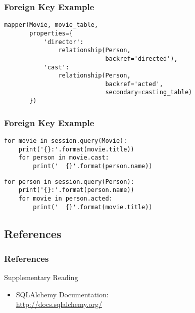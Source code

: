 \documentclass[dvipsnames]{beamer}
\theoremstyle{plain}
\begin{document}
\begin{frame}[fragile]
  \frametitle{Foreign Key Example}

  \begin{lstlisting}
mapper(Movie, movie_table,
       properties={
           'director':
               relationship(Person,
                            backref='directed'),
           'cast':
               relationship(Person,
                            backref='acted',
                            secondary=casting_table)
       })
  \end{lstlisting}
\end{frame}

\begin{frame}[fragile]
  \frametitle{Foreign Key Example}

  \begin{lstlisting}
for movie in session.query(Movie):
    print('{}:'.format(movie.title))
    for person in movie.cast:
        print('  {}'.format(person.name))
  \end{lstlisting}

  \pause
  \begin{lstlisting}
for person in session.query(Person):
    print('{}:'.format(person.name))
    for movie in person.acted:
        print('  {}'.format(movie.title))
  \end{lstlisting}
\end{frame}

\subsection*{References}

\begin{frame}
  \frametitle{References}

  \begin{block}{Supplementary Reading}
    \begin{itemize}
      \item SQLAlchemy Documentation:\\
        \url{http://docs.sqlalchemy.org/}
    \end{itemize}
  \end{block}
\end{frame}
\end{document}
